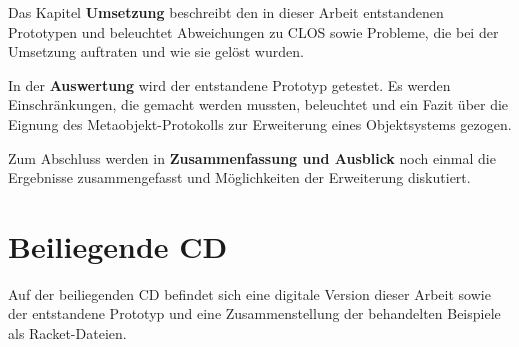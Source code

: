 Das Kapitel \textbf{Umsetzung} beschreibt den in dieser Arbeit entstandenen Prototypen und beleuchtet Abweichungen zu CLOS sowie Probleme, die bei der Umsetzung auftraten und wie sie gelöst wurden.

In der \textbf{Auswertung} wird der entstandene Prototyp getestet. Es werden Einschränkungen, die gemacht werden mussten, beleuchtet und ein Fazit über die Eignung des Metaobjekt-Protokolls zur Erweiterung eines Objektsystems gezogen.

Zum Abschluss werden in \textbf{Zusammenfassung und Ausblick} noch einmal die Ergebnisse zusammengefasst und Möglichkeiten der Erweiterung diskutiert.

\section{Beiliegende CD}
Auf der beiliegenden CD befindet sich eine digitale Version dieser Arbeit sowie der entstandene Prototyp und eine Zusammenstellung der behandelten Beispiele als Racket-Dateien.

